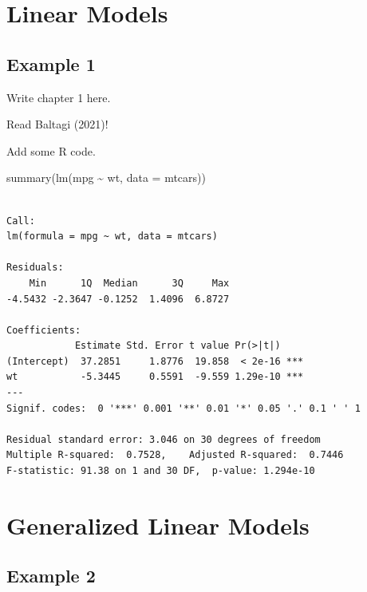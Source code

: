 \documentclass[letterpaper, 11pt, oneside]{scrbook}
\newenvironment{Shaded}{\begin{snugshade}}{\end{snugshade}}
\newcommand{\AttributeTok}[1]{\textcolor[rgb]{0.77,0.63,0.00}{#1}}
\newcommand{\FunctionTok}[1]{\textcolor[rgb]{0.00,0.00,0.00}{#1}}
\newcommand{\NormalTok}[1]{#1}
\newcommand{\SpecialCharTok}[1]{\textcolor[rgb]{0.00,0.00,0.00}{#1}}
\begin{document}
  \hypertarget{linear-models}{%
  \chapter{Linear Models}\label{linear-models}}

  \hypertarget{example-1}{%
  \section{Example 1}\label{example-1}}

  Write chapter 1 here.

  Read Baltagi (2021)!

  Add some R code.

\begin{Shaded}
\begin{Highlighting}[]
\FunctionTok{summary}\NormalTok{(}\FunctionTok{lm}\NormalTok{(mpg }\SpecialCharTok{\textasciitilde{}}\NormalTok{ wt, }\AttributeTok{data =}\NormalTok{ mtcars))}
\end{Highlighting}
\end{Shaded}

\begin{verbatim}

Call:
lm(formula = mpg ~ wt, data = mtcars)

Residuals:
    Min      1Q  Median      3Q     Max 
-4.5432 -2.3647 -0.1252  1.4096  6.8727 

Coefficients:
            Estimate Std. Error t value Pr(>|t|)    
(Intercept)  37.2851     1.8776  19.858  < 2e-16 ***
wt           -5.3445     0.5591  -9.559 1.29e-10 ***
---
Signif. codes:  0 '***' 0.001 '**' 0.01 '*' 0.05 '.' 0.1 ' ' 1

Residual standard error: 3.046 on 30 degrees of freedom
Multiple R-squared:  0.7528,    Adjusted R-squared:  0.7446 
F-statistic: 91.38 on 1 and 30 DF,  p-value: 1.294e-10
\end{verbatim}

  \hypertarget{generalized-linear-models}{%
  \chapter{Generalized Linear Models}\label{generalized-linear-models}}

  \hypertarget{example-2}{%
  \section{Example 2}\label{example-2}}
\end{document}
